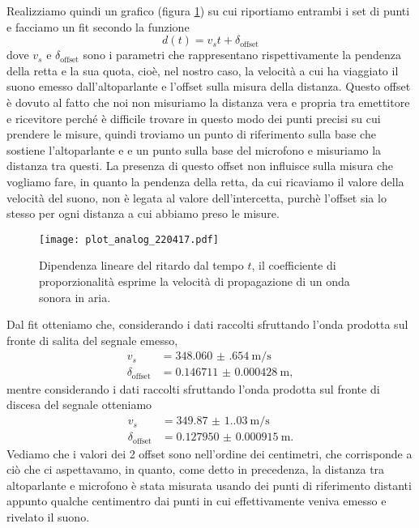 \documentclass[
    rmp,
    reprint, 
    superscriptaddress, 
    altaffilletter, 
    amsmath, 
    amssymb, 
    a4paper,
    varvw]{revtex4-2}
\begin{document}
Realizziamo quindi un grafico (figura \ref{fig:analog_plot_d1}) su cui riportiamo entrambi i set di punti e facciamo un fit secondo la funzione \begin{equation}
     d(t)=v_s t+\delta_\text{offset}
\end{equation} dove $v_s$ e $\delta_\text{offset}$ sono i parametri che rappresentano rispettivamente la pendenza della retta e la sua quota, cioè, nel nostro caso, la velocità a cui ha viaggiato il suono emesso dall'altoparlante e l'offset sulla misura della distanza. Questo offset è dovuto al fatto che noi non misuriamo la distanza vera e propria tra emettitore e ricevitore perché è difficile trovare in questo modo dei punti precisi su cui prendere le misure, quindi troviamo un punto di riferimento sulla base che sostiene l'altoparlante e e un punto sulla base del microfono e misuriamo la distanza tra questi. La presenza di questo offset non influisce sulla misura che vogliamo fare, in quanto la pendenza della retta, da cui ricaviamo il valore della velocità del suono, non è legata al valore dell'intercetta, purchè l'offset sia lo stesso per ogni distanza a cui abbiamo preso le misure.

\begin{figure}[!t]
    \centering
    \texttt{[image: plot\_analog\_220417.pdf]}
    \caption{Dipendenza lineare del ritardo dal tempo $t$, il coefficiente di proporzionalità esprime la velocità di propagazione di un onda sonora in aria.}\label{fig:analog_plot_d1}
\end{figure}

Dal fit otteniamo che, considerando i dati raccolti sfruttando l'onda prodotta sul fronte di salita del segnale emesso, \begin{align*}
    v_s &=\SI{348.060(654)}{\metre\per\second}\\
    \delta_\text{offset} &=\SI{0.146711(428)}{\metre},
\end{align*} mentre considerando i dati raccolti sfruttando l'onda prodotta sul fronte di discesa del segnale otteniamo \begin{align*}
    v_s &=\SI{349.87(1.03)}{\metre\per\second}\\
    \delta_\text{offset} &=\SI{0.127950(915)}{\metre}.
\end{align*}
Vediamo che i valori dei 2 offset sono nell'ordine dei centimetri, che corrisponde a ciò che ci aspettavamo, in quanto, come detto in precedenza, la distanza tra altoparlante e microfono è stata misurata usando dei punti di riferimento distanti appunto qualche centimentro dai punti in cui effettivamente veniva emesso e rivelato il suono. 
\end{document}
